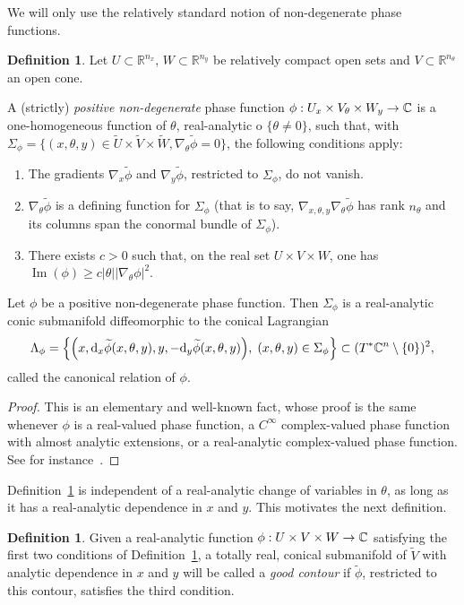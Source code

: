 \documentclass[10pt]{amsart}
\theoremstyle{definition}\newtheorem{defi}[theo]{Definition}\newtheorem{rema}[theo]{Remark}\newtheorem{exam}[theo]{Example}\newtheorem{exem}[theo]{Example}\newtheorem{nota}[theo]{Notation}
\DeclareMathOperator{\im}{Im}
\newcommand\1{\mathds{1}}
\newcommand{\R}{\mathbb{R}}
\newcommand{\C}{\mathbb{C}}
\newcommand{\dd}{\mathrm{d}}
\renewcommand*{\to}{\mathchoice{\longrightarrow}{\rightarrow}{\rightarrow}{\rightarrow}}
\let\originalleft\left
\let\originalright\right
\renewcommand{\left}{\mathopen{}\mathclose\bgroup\originalleft}
\renewcommand{\right}{\aftergroup\egroup\originalright}
\begin{document}
We will only use the relatively standard notion of non-degenerate phase functions.
\begin{defi}\label{def:good_phase}
Let $U\subset \R^{n_x}$, $W\subset
\R^{n_y}$ be relatively compact open sets and $V\subset
\R^{n_{\theta}}$ an open cone.

A (strictly) \emph{positive non-degenerate} phase function $\phi:U_x\times V_{\theta}\times W_y\to \C$ is a one-homogeneous function of $\theta$, real-analytic o $\{\theta\neq 0\}$, such that, with $\Sigma_{\phi}=\{(x,\theta,y)\in \widetilde{U}\times
\widetilde{V}\times \widetilde{W},
\nabla_{\theta}\widetilde{\phi}=0\}$, the following conditions apply:
\begin{enumerate}
\item\label{defi3.12.1} The gradients $\nabla_x\widetilde{\phi}$ and $\nabla_y\widetilde{\phi}$, restricted to $\Sigma_{\phi}$, do not vanish.
\item\label{defi3.12.2} $\nabla_{\theta}\widetilde{\phi}$ is a defining function for $\Sigma_{\phi}$ (that is to say, $\nabla_{x,\theta,y}\nabla_{\theta}\widetilde{\phi}$ has rank $n_{\theta}$ and its columns span the conormal bundle of $\Sigma_{\phi}$).
\item\label{defi3.12.3} There exists $c>0$ such that, on the real set $U\times V\times W$, one has $\im(\phi)\geq c|\theta||\nabla_{\theta}\phi|^2$.
\end{enumerate}
\end{defi}

\begin{prop}\label{prop:lagr}
Let $\phi$ be a positive non-degenerate phase function. Then $\Sigma_{\phi}$ is a real-analytic conic submanifold diffeomorphic to the conical Lagrangian
\[
\Lambda_{\phi}=\left\{\left(x,\dd_x\widetilde\phi(x,\theta,y),y,-\dd_y\widetilde\phi(x,\theta,y)\right),\;(x,\theta,y)\in
\Sigma_{\phi}\right\}\subset (T^*\C^n\setminus \{0\})^2,
\]
called the canonical relation of $\phi$.
\end{prop}
\begin{proof}
This is an elementary and well-known fact, whose proof is the same whenever $\phi$ is a real-valued phase function, a $C^{\infty}$ complex-valued phase function with almost analytic extensions, or a real-analytic complex-valued phase function. See for instance~\cite[Proposition~25.4.4]{hormander_analysis_1985}.
\end{proof}

Definition~\ref{def:good_phase} is independent of a real-analytic change of variables in $\theta$, as long as it has a real-analytic dependence in $x$ and $y$. This motivates the next definition.
\begin{defi}\label{def:good_contour}
Given a real-analytic function $\phi:U\times V\times W\to \C$ satisfying the first two conditions of Definition~\ref{def:good_phase}, a totally real, conical submanifold of $\widetilde{V}$ with analytic dependence in $x$ and $y$ will be called a \emph{good contour} if $\widetilde{\phi}$, restricted to this contour, satisfies the third condition.
\end{defi}
\end{document}
